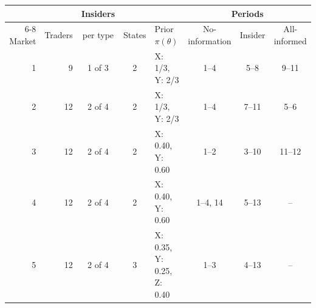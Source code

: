 \begin{tabular}{rrcclccc}
\toprule
 & & Insiders & & & \multicolumn{3}{c}{Periods} \\
\cmidrule(lr){6-8}
Market & Traders & per type & States & Prior $\pi(\theta)$ & No-information & Insider & All-informed \\
\midrule
1 & 9 & 1 of 3 & 2 & X: 1/3, Y: 2/3 & 1--4 & 5--8 & 9--11 \\
2 & 12 & 2 of 4 & 2 & X: 1/3, Y: 2/3 & 1--4 & 7--11 & 5--6 \\
3 & 12 & 2 of 4 & 2 & X: 0.40, Y: 0.60 & 1--2 & 3--10 & 11--12 \\
4 & 12 & 2 of 4 & 2 & X: 0.40, Y: 0.60 & 1--4, 14 & 5--13 & -- \\
5 & 12 & 2 of 4 & 3 & X: 0.35, Y: 0.25, Z: 0.40 & 1--3 & 4--13 & -- \\
\bottomrule
\end{tabular}
